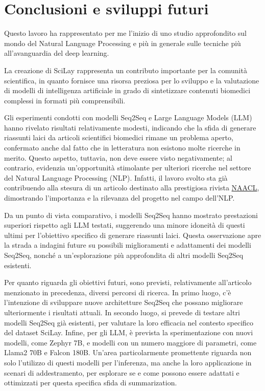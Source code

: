 \documentclass[12pt,a4paper,twoside,openright]{book}
\begin{document}

\chapter*{Conclusioni e sviluppi futuri}

Questo lavoro ha rappresentato per me l'inizio di uno studio approfondito sul mondo del Natural Language Processing e più in generale sulle tecniche più all'avanguardia del deep learning. 

La creazione di SciLay rappresenta un contributo importante per la comunità scientifica, in quanto fornisce una risorsa preziosa per lo sviluppo e la valutazione di modelli di intelligenza artificiale in grado di sintetizzare contenuti biomedici complessi in formati più comprensibili.

Gli esperimenti condotti con modelli Seq2Seq e Large Language Models (LLM) hanno rivelato risultati relativamente modesti, indicando che la sfida di generare riassunti laici da articoli scientifici biomedici rimane un problema aperto, confermato anche dal fatto che in letteratura non esistono molte ricerche in merito. Questo aspetto, tuttavia, non deve essere visto negativamente; al contrario, evidenzia un'opportunità stimolante per ulteriori ricerche nel settore del Natural Language Processing (NLP). Infatti, il lavoro svolto sta già contribuendo alla stesura di un articolo destinato alla prestigiosa rivista \href{https://2022.naacl.org/}{NAACL}, dimostrando l'importanza e la rilevanza del progetto nel campo dell'NLP.

Da un punto di vista comparativo, i modelli Seq2Seq hanno mostrato prestazioni superiori rispetto agli LLM testati, suggerendo una minore idoneità di questi ultimi per l'obiettivo specifico di generare riassunti laici. Questa osservazione apre la strada a indagini future su possibili miglioramenti e adattamenti dei modelli Seq2Seq, nonché a un'esplorazione più approfondita di altri modelli Seq2Seq esistenti.

Per quanto riguarda gli obiettivi futuri, sono previsti, relativamente all'articolo menzionato in precedenza, diversi percorsi di ricerca. In primo luogo, c'è l'intenzione di sviluppare nuove architetture Seq2Seq che possano migliorare ulteriormente i risultati attuali. In secondo luogo, si prevede di testare altri modelli Seq2Seq già esistenti, per valutare la loro efficacia nel contesto specifico del dataset SciLay. Infine, per gli LLM, è prevista la sperimentazione con nuovi modelli, come Zephyr 7B, e modelli con un numero maggiore di parametri, come Llama2 70B e Falcon 180B. Un'area particolarmente promettente riguarda non solo l'utilizzo di questi modelli per l'inferenza, ma anche la loro applicazione in scenari di addestramento, per esplorare se e come possono essere adattati e ottimizzati per questa specifica sfida di summarization.
\end{document}
